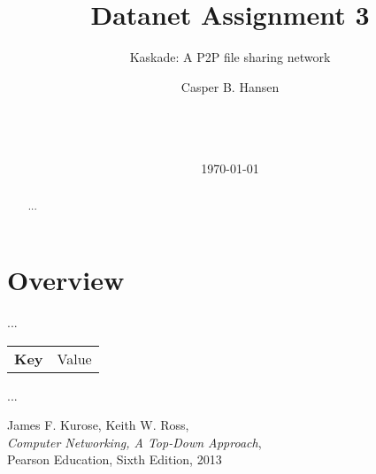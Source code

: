 \documentclass{acm_proc_article-sp}
\begin{document}
\title{Datanet Assignment 3}
\subtitle{Kaskade: A P2P file sharing network}

\author{
    \alignauthor
    Casper B. Hansen\\
    \\
    \\
    \\
}

\date{\today}

\maketitle
\begin{abstract}
    ...
\end{abstract}


\terms{}

\section{Overview}
\label{sec:overview}
...

\begin{tabular}{ll}
    {\bf Key}     & Value \\
\end{tabular}

...

\balancecolumns


\begin{thebibliography}{9}
    
        James F. Kurose, Keith W. Ross,\\
        \emph{Computer Networking, A Top-Down Approach},\\
        Pearson Education, Sixth Edition, 2013
    
\end{thebibliography}
\end{document}
